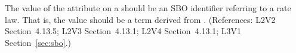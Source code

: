 The value of the  attribute on a \KineticLaw should be an SBO
identifier referring to a rate law.  That is, the value should be a term
derived from \sboratelaw.  (References: L2V2 Section~4.13.5; L2V3
Section~4.13.1; L2V4 Section~4.13.1; L3V1 Section~\ref{sec:sbo}.)
